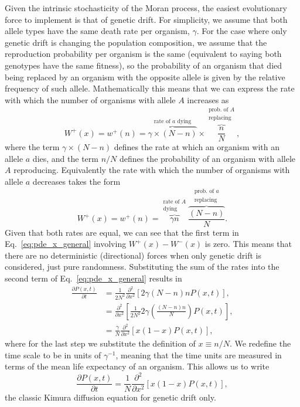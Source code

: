 Given the intrinsic stochasticity of the Moran process, the easiest evolutionary
force to implement is that of genetic drift. For simplicity, we assume that both
allele types have the same death rate per organism, $\gamma$. For the case where
only genetic drift is changing the population composition, we assume that the
reproduction probability per organism is the same (equivalent to saying both
genotypes have the same fitness), so the probability of an organism that died
being replaced by an organism with the opposite allele is given by the relative
frequency of such allele. Mathematically this means that we can express the rate
with which the number of organisms with allele $A$ increases as
\begin{equation}
    W^+(x) = w^+(n) = 
    \overbrace{\gamma \times (N-n)}^{\text{rate of $a$ dying}} \times
    \overbrace{\frac{n}{N}}^
    {\substack{\text{prob. of $A$} \\ \text{replacing}}},
\end{equation}
where the term $\gamma \times (N-n)$ defines the rate at which an organism with
an allele $a$ dies, and the term $n/N$ defines the probability of an organism
with allele $A$ reproducing. Equivalently the rate with which the number of
organisms with allele $a$ decreases takes the form
\begin{equation}
    W^+(x) = w^+(n) = 
    \overbrace{\gamma n}^{\substack{\text{rate of $A$}\\ \text{dying}}}
    \overbrace{\frac{(N-n)}{N}}^
    {\substack{\text{prob. of $a$} \\ \text{replacing}}}.
\end{equation}
Given that both rates are equal, we can see that the first term in
Eq.~\ref{eq:pde_x_general} involving $W^+(x) - W^-(x)$ is zero. This means that
there are no deterministic (directional) forces when only genetic drift is
considered, just pure randomness. Substituting the sum of the rates into the
second term of Eq.~\ref{eq:pde_x_general} results in
\begin{equation}
\begin{aligned}
    \frac{\partial P(x, t)}{\partial t} &=\frac{1}{2 N^{2}} 
    \frac{\partial^{2}}{\partial x^{2}}[2 \gamma(N-n) n P(x, t)], \\
    &=\frac{\partial^{2}}{\partial x^{2}}
    \left[\frac{1}{2 N^{2}} 2 \gamma\left(\frac{(N-n) n}{N} \right) P(x, t)\right],\\
    &=\frac{\gamma}{N} \frac{\partial^{2}}{\partial x^{2}}[x(1-x) P(x, t)],
\end{aligned}
\end{equation}
where for the last step we substitute the definition of $x\equiv n/N$. We
redefine the time scale to be in units of $\gamma^{-1}$, meaning that the time
units are measured in terms of the mean life expectancy of an organism. This
allows us to write
\begin{equation}
    \frac{\partial P(x, t)}{\partial t} =
    \frac{1}{N} \frac{\partial^{2}}{\partial x^{2}}[x(1-x) P(x, t)],
\end{equation}
the classic Kimura diffusion equation for genetic drift only.

